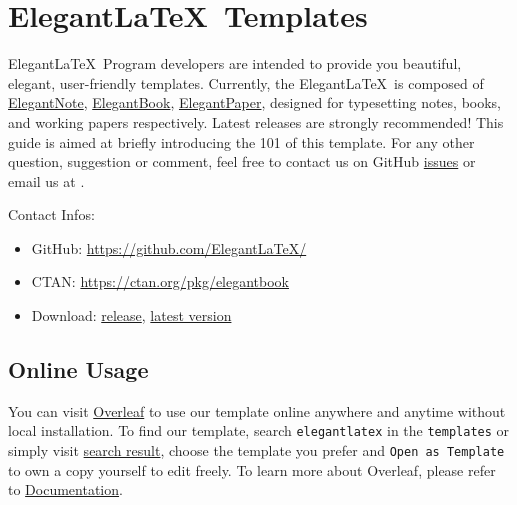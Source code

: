 \documentclass[11pt]{elegantbook}
\begin{document}
\maketitle

\frontmatter
\tableofcontents

\mainmatter

\chapter{Elegant\LaTeX\ Templates}
Elegant\LaTeX\ Program developers are intended to provide you beautiful, elegant, user-friendly templates. Currently, the Elegant\LaTeX\ is composed of \href{https://github.com/ElegantLaTeX/ElegantNote}{ElegantNote}, \href{https://github.com/ElegantLaTeX/ElegantBook}{ElegantBook}, \href{https://github.com/ElegantLaTeX/ElegantPaper}{ElegantPaper}, designed for typesetting notes, books, and working papers respectively. Latest releases are strongly recommended! This guide is aimed at briefly introducing the 101 of this template. For any other question, suggestion or comment, feel free to contact us on GitHub \href{https://github.com/ElegantLaTeX/ElegantBook/issues}{issues} or email us at .

Contact Infos:
\begin{itemize}
  \item GitHub: \href{https://github.com/ElegantLaTeX/}{https://github.com/ElegantLaTeX/}
  \item CTAN: \href{https://ctan.org/pkg/elegantbook}{https://ctan.org/pkg/elegantbook}
  \item Download: \href{https://github.com/ElegantLaTeX/ElegantBook/releases}{release}, \href{https://github.com/ElegantLaTeX/ElegantBook/archive/master.zip}{latest version}
\end{itemize}


\section{Online Usage}
You can visit \href{https://www.overleaf.com/}{Overleaf} to use our template online anywhere and anytime without local installation. To find our template, search \lstinline{elegantlatex} in the \lstinline{templates} or simply visit \href{https://www.overleaf.com/latex/templates?addsearch=elegantlatex}{search result}, choose the template you prefer and \lstinline{Open as Template} to own a copy yourself to edit freely. To learn more about Overleaf, please refer to \href{https://www.overleaf.com/learn}{Documentation}.
\end{document}
